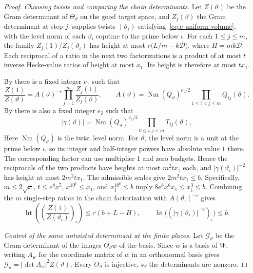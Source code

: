 \begin{proof}
\emph{Choosing twists and comparing the chain determinants.}
Let $Z(\vartheta)$ be the Gram determinant of $\Theta_\vartheta$ on the good target space, and $Z_j(\vartheta)$ the Gram determinant at step $j$.  supplies twists $(\vartheta_\iota)$ satisfying~\eqref{eq:c-uniform-volume}, with the level norm of each $\vartheta_\iota$ coprime to the prime below $\iota$. For each $1\le j\le m$, the family $Z_j(1)/Z_j(\vartheta_\iota)$ has height at most $r\bigl(L/m-k\mathcal D\bigr)$, where $H=mk\mathcal D$. Each reciprocal of a ratio in the next two factorizations is a product of at most $t$ inverse Hecke-value ratios of height at most $x_1$. Its height is therefore at most $tx_1$.

By  there is a fixed integer $e_1$ such that
\[
 \frac{Z(1)}{Z(\vartheta)}
 =A(\vartheta)^{-r}\prod_{j=1}^{m}\frac{Z_j(1)}{Z_j(\vartheta)},\qquad
 A(\vartheta)=\operatorname{Nm}(Q_\vartheta)^{e_1/2}
                  \prod_{1\le i<j\le m}Q_{ij}(\vartheta).
\]
By  there is also a fixed integer $e_2$ such that
\[
 |\gamma(\vartheta)|=\operatorname{Nm}(Q_\vartheta)^{e_2/2}
                   \prod_{0\le i,j<m}T_{ij}(\vartheta),
\]
Here $\operatorname{Nm}(Q_\vartheta)$ is the twist level norm. For $\vartheta_\iota$ the level norm is a unit at the prime below $\iota$, so its integer and half-integer powers have absolute value $1$ there. The corresponding factor can use multiplier $1$ and zero budgets. Hence the reciprocals of the two products have heights at most $m^2 t x_1$ each, and $|\gamma(\vartheta_\iota)|^{-2}$ has height at most $2m^2 t x_1$. The admissible scales give $2m^2tx_1\le b$. Specifically, $m\le 2\sqrt{x}$, $t\le e^8 x^5$, $x^{10^6}\le x_1$, and $x_1^{10^6}\le b$ imply $8e^8x^6x_1\le x_1^3\le b$. Combining the $m$ single-step ratios in the chain factorization with $A(\vartheta_\iota)^{-r}$ gives
\[
 \operatorname{ht}\left(\left(\frac{Z(1)}{Z(\vartheta_\iota)}\right)_\iota\right)
 \le r(b+L-H),\qquad
 \operatorname{ht}\bigl((|\gamma(\vartheta_\iota)|^{-2})_\iota\bigr)\le b.
\]

\emph{Control of the same untwisted determinant at the finite places.}
Let $\mathcal G_\vartheta$ be the Gram determinant of the images $\Theta_\vartheta w$ of the basis. Since $w$ is a basis of $W$, writing $A_w$ for the coordinate matrix of $w$ in an orthonormal basis gives $\mathcal G_\vartheta=|\det A_w|^2 Z(\vartheta)$. Every $\Theta_\vartheta$ is injective, so the determinants are nonzero.


\end{proof}
